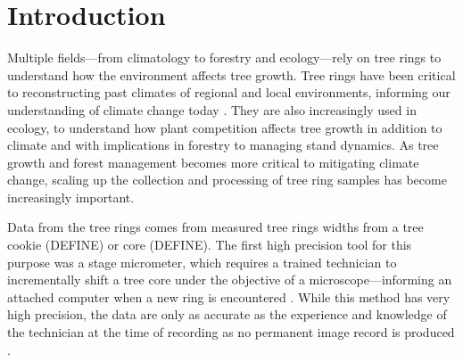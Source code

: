 \documentclass[a4paper,12pt]{article}
\begin{document}
\section{Introduction}
Multiple fields---from climatology to forestry and ecology---rely on tree rings to understand how the environment affects tree growth. Tree rings have been critical to 
reconstructing past climates of regional and local environments, informing our understanding of climate change today \citep{fritts_dendroclimatology_1971} \citep{williams_using_2010} \citep{guibal_dendrochronology_2021} \citep{sheppard_dendroclimatology_2010}. They are also increasingly used in ecology,  to understand how plant competition affects tree growth in addition to climate %
and with implications in forestry to managing stand dynamics. %
As tree growth and forest management becomes more critical to mitigating climate change, scaling up the collection and processing of tree ring samples has become increasingly important. 

Data from the tree rings comes from measured tree rings widths from a tree cookie (DEFINE) or core (DEFINE). The first high precision tool for this purpose was a stage micrometer, which requires a trained technician to incrementally shift a tree core under the objective of a microscope---informing an attached computer when a new ring is encountered \citep{robinson_microcomputer_nodate}. %
While this method has very high precision, the data are only as accurate as the experience and knowledge of the technician at the time of recording as no permanent image record is produced \citep{levanic_atrics_2007}. 
\end{document}
